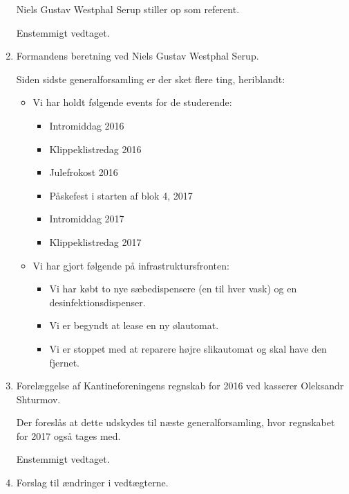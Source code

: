 \documentclass[a4paper]{article}
\begin{document}
\begin{enumerate}
Niels Gustav Westphal Serup stiller op som referent.

Enstemmigt vedtaget.


\item[\textsection 5] Formandens beretning ved Niels Gustav Westphal Serup.

Siden sidste generalforsamling er der sket flere ting, heriblandt:
\begin{itemize}

\item Vi har holdt følgende events for de studerende:
\begin{itemize}
\item Intromiddag 2016
\item Klippeklistredag 2016
\item Julefrokost 2016
\item Påskefest i starten af blok 4, 2017 
\item Intromiddag 2017
\item Klippeklistredag 2017
\end{itemize}

\item Vi har gjort følgende på infrastruktursfronten:
\begin{itemize}
\item Vi har købt to nye sæbedispensere (en til hver vask) og en
desinfektionsdispenser.
\item Vi er begyndt at lease en ny ølautomat.
\item Vi er stoppet med at reparere højre slikautomat og skal have den fjernet.
\end{itemize}

\end{itemize}


\item[\textsection 6] Forelæggelse af Kantineforeningens regnskab for 2016 ved
kasserer Oleksandr Shturmov.

Der foreslås at dette udskydes til næste generalforsamling, hvor regnskabet for
2017 også tages med.

Enstemmigt vedtaget.


\item[\textsection 7] Forslag til ændringer i vedtægterne.


\end{enumerate}
\end{document}
